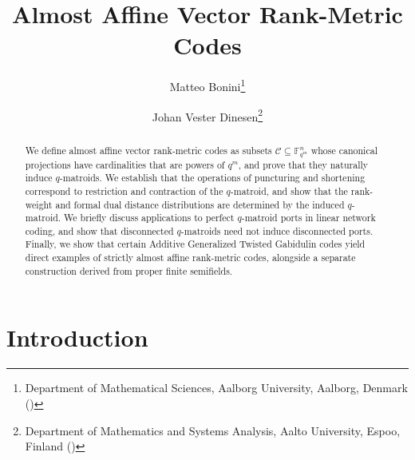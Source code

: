 \documentclass[a4paper,11pt,reqno]{article}
\title{\textbf{Almost Affine Vector Rank-Metric Codes}}
\author{Matteo Bonini\thanks{Department of Mathematical Sciences, Aalborg University, Aalborg, Denmark (\email{mabo@math.aau.dk})} \and Johan Vester Dinesen\thanks{Department of Mathematics and Systems Analysis, Aalto University, Espoo, Finland (\email{johan.v.dinesen@aalto.fi})}}
\date{}
\newcommand{\F}{\mathbb{F}}
\newcommand{\C}{\mathcal{C}}
\theoremstyle{plain} \numberwithin{equation}{section}
\theoremstyle{definition}
\begin{document}
\maketitle
\begin{abstract}
We define almost affine vector rank-metric codes as subsets $\C\subseteq \F_{q^m}^n$ whose canonical projections have cardinalities that are powers of $q^m$, and prove that they naturally induce $q$-matroids. We establish that the operations of puncturing and shortening correspond to restriction and contraction of the $q$-matroid, and show that the rank-weight and formal dual distance distributions are determined by the induced $q$-matroid. We briefly discuss applications to perfect $q$-matroid ports in linear network coding, and show that disconnected $q$-matroids need not induce disconnected ports. Finally, we show that certain Additive Generalized Twisted Gabidulin codes yield direct examples of strictly almost affine rank-metric codes, alongside a separate construction derived from proper finite semifields.
\end{abstract}


\section{Introduction}
\end{document}
